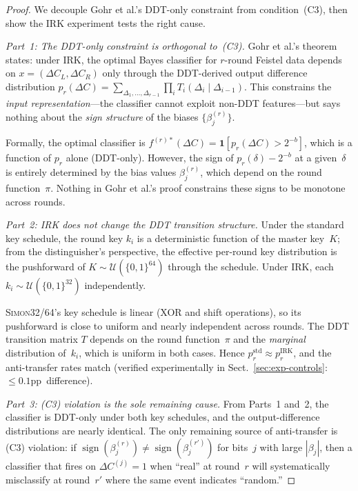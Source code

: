 \documentclass[runningheads]{llncs}
\newcommand{\simon}{\textsc{Simon32/64}}
\newcommand{\pp}{pp}
\begin{document}
\begin{proof}
We decouple Gohr et al.'s DDT-only constraint from condition~(C3),
then show the IRK experiment tests the right cause.

\medskip\noindent\textit{Part~1: The DDT-only constraint is orthogonal
to~(C3).}
Gohr et al.'s theorem states: under IRK, the optimal Bayes classifier
for $r$-round Feistel data depends on
$x = (\Delta C_L, \Delta C_R)$ only through the DDT-derived output
difference distribution
$p_r(\Delta C)
= \sum_{\Delta_1,\ldots,\Delta_{r-1}} \prod_i T_i(\Delta_i \mid
\Delta_{i-1})$.
This constrains the \emph{input representation}---the classifier cannot
exploit non-DDT features---but says nothing about the \emph{sign
structure} of the biases $\{\beta_j^{(r)}\}$.

Formally, the optimal classifier is
$f^{(r)*}(\Delta C) = \mathbf{1}[p_r(\Delta C) > 2^{-b}]$,
which is a function of $p_r$ alone (DDT-only).
However, the sign of $p_r(\delta) - 2^{-b}$ at a given~$\delta$ is
entirely determined by the bias values $\beta_j^{(r)}$, which depend
on the round function~$\pi$.
Nothing in Gohr et al.'s proof constrains these signs to be monotone
across rounds.

\medskip\noindent\textit{Part~2: IRK does not change the DDT transition
structure.}
Under the standard key schedule, the round key $k_i$ is a deterministic
function of the master key~$K$;
from the distinguisher's perspective, the effective per-round key
distribution is the pushforward of $K \sim
\mathcal{U}(\{0,1\}^{64})$ through the schedule.
Under IRK, each $k_i \sim \mathcal{U}(\{0,1\}^{32})$ independently.

\simon's key schedule is linear (XOR and shift operations), so its
pushforward is close to uniform and nearly independent across rounds.
The DDT transition matrix $T$ depends on the round function~$\pi$ and
the \emph{marginal} distribution of~$k_i$, which is uniform in both
cases.
Hence $p_r^{\mathrm{std}} \approx p_r^{\mathrm{IRK}}$, and the
anti-transfer rates match (verified experimentally in Sect.~\ref{sec:exp-controls}: $\leq 0.1$\pp\ difference).

\medskip\noindent\textit{Part~3: (C3) violation is the sole remaining
cause.}
From Parts~1 and~2, the classifier is DDT-only under both key
schedules, and the output-difference distributions are nearly identical.
The only remaining source of anti-transfer is (C3) violation: if
$\operatorname{sign}(\beta_j^{(r)}) \neq
\operatorname{sign}(\beta_j^{(r')})$
for bits~$j$ with large $|\beta_j|$, then a classifier that fires on
$\Delta C^{(j)} = 1$ when ``real'' at round~$r$ will systematically
misclassify at round~$r'$ where the same event indicates ``random.''
\end{proof}
\end{document}
